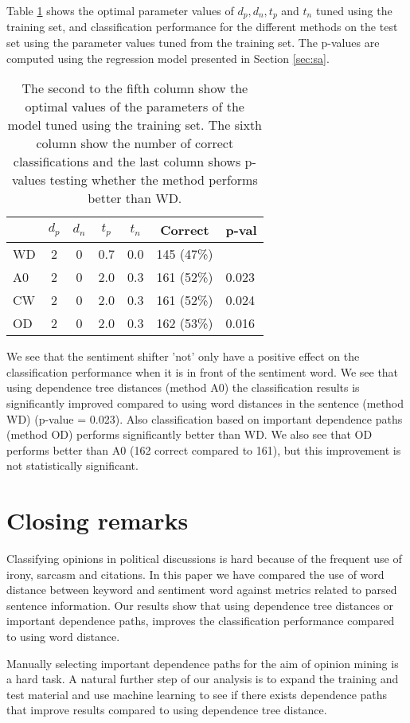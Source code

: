 \documentclass[11pt]{article}
\begin{document}
Table \ref{tab:2} shows the optimal parameter values of $d_p, d_n, t_p$ and $t_n$ tuned using the training set, and classification performance for the different methods on the test set using the parameter values tuned from the training set. The p-values are computed using the regression model presented in Section \ref{sec:sa}.
\begin{table}
  \caption{The second to the fifth column show the optimal values of the parameters of the model tuned using the training set. The sixth column show the number of correct classifications and the last column shows p-values testing whether the method performs better than WD.}
  \centering
  \begin{tabular}{lcccccl}
       & $d_p$ & $d_n$ & $t_p$ & $t_n$ & Correct   & p-val \\ \hline
    WD &    2  &   0  & 0.7  &  0.0  & 145 (47\%) & \\
    A0 &    2  &   0  & 2.0  &  0.3  & 161 (52\%) & 0.023\\
    CW &    2  &   0  & 2.0  &  0.3  & 161 (52\%) & 0.024\\
    OD &    2  &   0  & 2.0  &  0.3  & 162 (53\%) & 0.016
  \end{tabular}
  \label{tab:2}
\end{table}
We see that the sentiment shifter 'not' only have a positive effect on the classification performance when it is in front of the sentiment word. We see that using dependence tree distances (method A0) the classification results is significantly improved compared to using word distances in the sentence (method WD) (p-value = 0.023). Also classification based on important dependence paths (method OD) performs significantly better than WD. We also see that OD performs better than A0 (162 correct compared to 161), but this improvement is not statistically significant. 

\section{Closing remarks}
\label{sec:cr}

Classifying opinions in political discussions is hard because of the frequent use of irony, sarcasm and citations. In this paper we have compared the use of word distance between keyword and sentiment word against metrics related to parsed sentence information. Our results show that using dependence tree distances or important dependence paths, improves the classification performance compared to using word distance. 

Manually selecting important dependence paths for the aim of opinion mining is a hard task. A natural further step of our analysis is to expand the training and test material and use machine learning to see if there exists dependence paths that improve results compared to using dependence tree distance.


\end{document}
